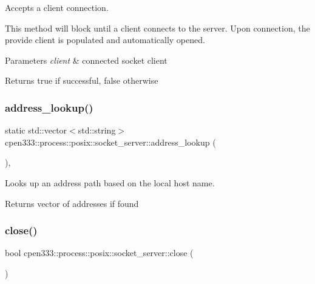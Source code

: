 Accepts a client connection. 

This method will block until a client connects to the server. Upon connection, the provide client is populated and automatically opened.


\begin{DoxyParams}{Parameters}
{\em client} & connected socket client \\
\hline
\end{DoxyParams}
\begin{DoxyReturn}{Returns}
true if successful, false otherwise 
\end{DoxyReturn}
\mbox{\label{classcpen333_1_1process_1_1posix_1_1socket__server_a2ff19c8146dd6f5dcb72606311fffedd}} 
\subsubsection{\texorpdfstring{address\+\_\+lookup()}{address\_lookup()}}
{\footnotesize\ttfamily static std\+::vector$<$std\+::string$>$ cpen333\+::process\+::posix\+::socket\+\_\+server\+::address\+\_\+lookup (\begin{DoxyParamCaption}{ }\end{DoxyParamCaption})\hspace{0.3cm}{\ttfamily [inline]}, {\ttfamily [static]}}



Looks up an address path based on the local host name. 

\begin{DoxyReturn}{Returns}
vector of addresses if found 
\end{DoxyReturn}
\mbox{\label{classcpen333_1_1process_1_1posix_1_1socket__server_a306aea15eb1c856f269b1c3727fbfa17}} 
\subsubsection{\texorpdfstring{close()}{close()}}
{\footnotesize\ttfamily bool cpen333\+::process\+::posix\+::socket\+\_\+server\+::close (\begin{DoxyParamCaption}{ }\end{DoxyParamCaption})\hspace{0.3cm}{\ttfamily [inline]}}



